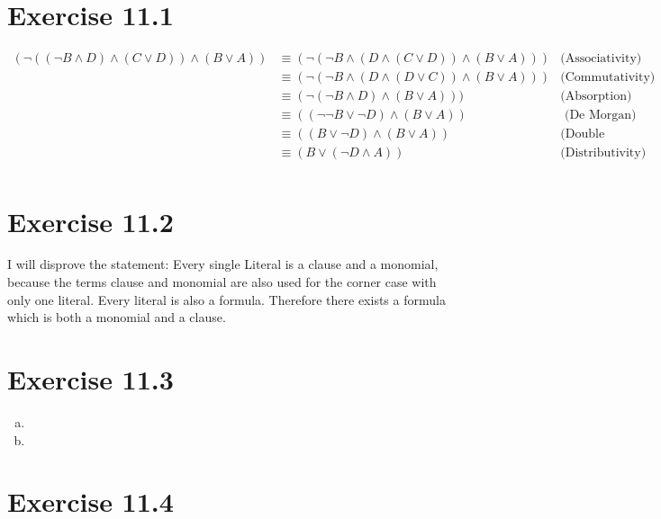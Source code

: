 \documentclass{article} %
\newcommand{\homeworkNumber}{11}
\begin{document}
\section*{Exercise \homeworkNumber.1}
\begin{align*}
	(\neg((\neg B \land D) \land (C \lor D)) \land (B \lor A)) & \equiv (\neg(\neg B \land (D \land (C \lor D)) \land (B \lor A))) & \text{(Associativity)}    \\
	                                                           & \equiv (\neg(\neg B \land (D \land (D \lor C)) \land (B \lor A))) & \text{(Commutativity) }   \\
	                                                           & \equiv (\neg(\neg B \land D) \land (B \lor A)))                   & \text{(Absorption) }      \\
	                                                           & \equiv ((\neg\neg B \lor \neg D) \land (B \lor A))                & \text{ (De Morgan) }      \\
	                                                           & \equiv ((B \lor \neg D) \land (B \lor A))                         & \text{(Double Negation) } \\
	                                                           & \equiv (B \lor ( \neg D \land A))                                 & \text{(Distributivity) }  \\
\end{align*}


\section*{Exercise \homeworkNumber.2}
I will disprove the statement: Every single Literal is a clause and a monomial, because the terms clause and monomial are also used for the corner case with only one literal. Every literal is also a formula. Therefore there exists a formula which is both a monomial and a clause.




\section*{Exercise \homeworkNumber.3}
\begin{enumerate}[(a)]
	\item
	\item
\end{enumerate}



\section*{Exercise \homeworkNumber.4}
\end{document}

